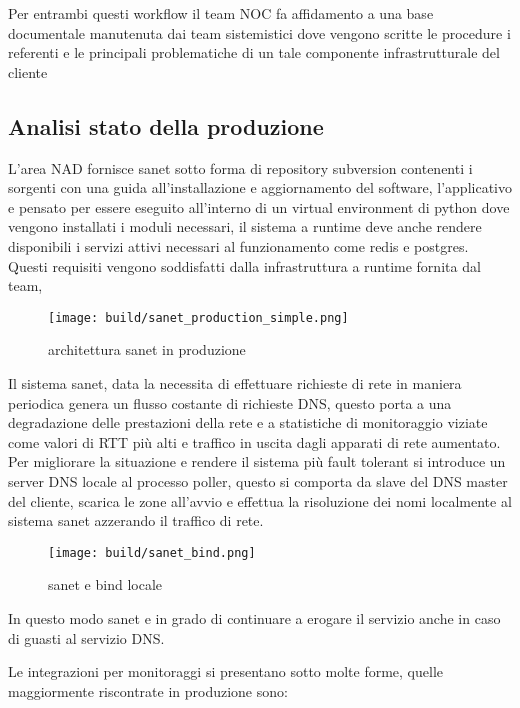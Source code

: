 Per entrambi questi workflow il team NOC fa affidamento a una base documentale manutenuta dai team sistemistici dove vengono scritte le procedure i referenti e le principali problematiche di un tale componente infrastrutturale del cliente

\newpage
\subsection{Analisi stato della produzione}

L'area NAD fornisce sanet sotto forma di repository subversion contenenti i sorgenti con una guida all'installazione e aggiornamento del software, l'applicativo e pensato per essere eseguito all'interno di un virtual environment di python dove vengono installati i moduli necessari, il sistema a runtime deve anche rendere disponibili i servizi attivi necessari al funzionamento come redis e postgres. Questi requisiti vengono soddisfatti dalla infrastruttura a runtime fornita dal team,

\begin{figure}[H]
    \centering
    \texttt{[image: build/sanet\_production\_simple.png]}
    \caption{architettura sanet in produzione}
    \label{fig:enter-label}
\end{figure}

Il sistema sanet, data la necessita di effettuare richieste di rete in maniera periodica genera un flusso costante di richieste DNS, questo porta a una degradazione delle prestazioni della rete e a statistiche di monitoraggio viziate come valori di RTT più alti e traffico in uscita dagli apparati di rete aumentato. Per migliorare la situazione e rendere il sistema più fault tolerant si introduce un server DNS locale al processo poller, questo si comporta da slave del DNS master del cliente, scarica le zone all'avvio e effettua la risoluzione dei nomi localmente al sistema sanet azzerando il traffico di rete.


\begin{figure}[H]
    \centering
    \texttt{[image: build/sanet\_bind.png]}
    \caption{sanet e bind locale}
    \label{fig:enter-label}
\end{figure}

In questo modo sanet e in grado di continuare a erogare il servizio anche in caso di guasti al servizio DNS.

Le integrazioni per monitoraggi si presentano sotto molte forme, quelle maggiormente riscontrate in produzione sono:

